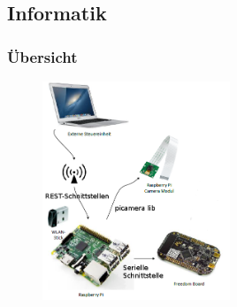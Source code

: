 \subsection{Informatik}

\author{Alexander Suter}

\begin{frame}
	\frametitle{Übersicht\hfill{}\footnotesize \group}

		\begin{figure}
			\centering
			\includegraphics[width=0.5\textwidth]{../../fig/blockdiagramm-informatik.png}
		\end{figure}
		
		
		
		
		
		

\end{frame}

